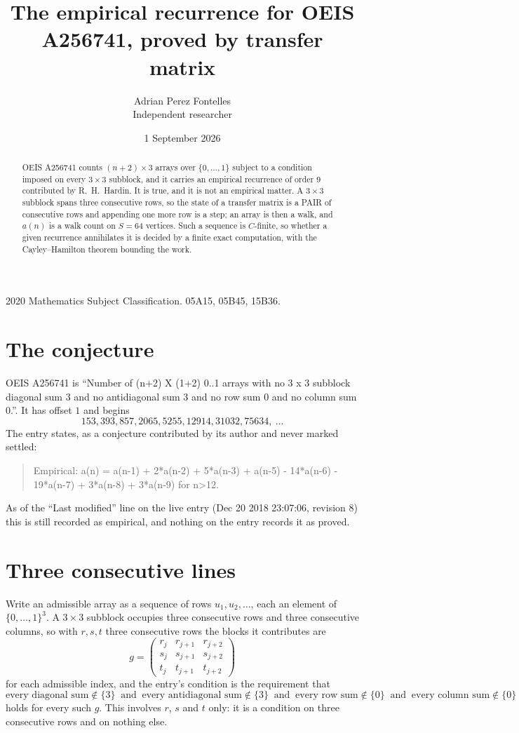 \documentclass[11pt,a4paper]{article}
\title{The empirical recurrence for OEIS A256741, proved by transfer matrix}
\author{Adrian Perez Fontelles\\ \small Independent researcher}
\date{1 September 2026}
\theoremstyle{plain}
\theoremstyle{definition}
\begin{document}
\maketitle

\begin{abstract}
OEIS A256741 counts $(n+2)\times3$ arrays over $\{0,\dots,1\}$ subject to a condition imposed on
every $3\times3$ subblock, and it carries an empirical recurrence of order $9$
contributed by R.~H.~Hardin. It is true, and it is not an empirical matter. A $3\times3$
subblock spans three consecutive rows, so the state of a transfer matrix is a PAIR of
consecutive rows and appending one more row is a step; an array is then a walk, and
$a(n)$ is a walk count on $S=64$ vertices. Such a sequence is $C$-finite, so whether a given
recurrence annihilates it is decided by a finite exact computation, with the Cayley--Hamilton
theorem bounding the work.
\end{abstract}

\noindent\small 2020 Mathematics Subject Classification. 05A15, 05B45, 15B36.\normalsize

\section{The conjecture}

OEIS A256741 is ``Number of (n+2) X (1+2) 0..1 arrays with no 3 x 3 subblock diagonal sum 3 and no antidiagonal sum 3 and no row sum 0 and no column sum 0.''. It has offset $1$ and begins
\[
153, 393, 857, 2065, 5255, 12914, 31032, 75634,\ \dots
\]
The entry states, as a conjecture contributed by its author and never marked settled:
\begin{quote}
Empirical: a(n) = a(n-1) + 2*a(n-2) + 5*a(n-3) + a(n-5) - 14*a(n-6) - 19*a(n-7) + 3*a(n-8) + 3*a(n-9) for n>12.
\end{quote}
As of the ``Last modified'' line on the live entry (Dec 20 2018 23:07:06, revision 8) this is still
recorded as empirical, and nothing on the entry records it as proved.

\section{Three consecutive lines}

Write an admissible array as a sequence of rows $u_1,u_2,\dots$, each an element of
$\{0,\dots,1\}^{3}$. A $3\times3$ subblock occupies three consecutive rows and
three consecutive columns, so with $r,s,t$ three consecutive rows the blocks it
contributes are
\[
g=\begin{pmatrix}r_j&r_{j+1}&r_{j+2}\\ s_j&s_{j+1}&s_{j+2}\\ t_j&t_{j+1}&t_{j+2}\end{pmatrix}
\]
for each admissible index, and the entry's condition is the requirement that
\[
\text{every diagonal sum} \notin \{3\}\ \text{ and }\ \text{every antidiagonal sum} \notin \{3\}\ \text{ and }\ \text{every row sum} \notin \{0\}\ \text{ and }\ \text{every column sum} \notin \{0\}
\]
holds for every such $g$. This involves $r$, $s$ and $t$ only: it is a condition on
three consecutive rows and on nothing else.
\end{document}
